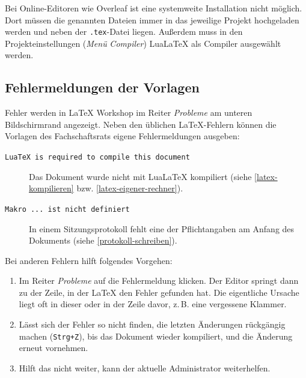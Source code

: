 
Bei Online-Editoren wie Overleaf ist eine systemweite Installation nicht möglich. Dort müssen die genannten Dateien immer in das jeweilige Projekt hochgeladen werden und neben der \texttt{.tex}-Datei liegen. Außerdem muss in den Projekteinstellungen (\textit{Menü} \textrightarrow{} \textit{Compiler}) LuaLaTeX als Compiler ausgewählt werden.

\subsection{Fehlermeldungen der Vorlagen}
\label{latex-fehlermeldungen}
Fehler werden in LaTeX Workshop im Reiter \textit{Probleme} am unteren Bildschirmrand angezeigt. Neben den üblichen \LaTeX{}-Fehlern können die Vorlagen des Fachschaftsrats eigene Fehlermeldungen ausgeben:
\begin{description}
	\item[\texttt{LuaTeX is required to compile this document}] Das Dokument wurde nicht mit LuaLaTeX kompiliert (siehe \autoref{latex-kompilieren} bzw. \autoref{latex-eigener-rechner}).
	\item[\texttt{Makro ... ist nicht definiert}] In einem Sitzungsprotokoll fehlt eine der Pflichtangaben am Anfang des Dokuments (siehe \autoref{protokoll-schreiben}).
\end{description}

Bei anderen Fehlern hilft folgendes Vorgehen:
\begin{enumerate}
	\item Im Reiter \textit{Probleme} auf die Fehlermeldung klicken. Der Editor springt dann zu der Zeile, in der \LaTeX{} den Fehler gefunden hat. Die eigentliche Ursache liegt oft in dieser oder in der Zeile davor, z.\,B. eine vergessene Klammer.
	\item Lässt sich der Fehler so nicht finden, die letzten Änderungen rückgängig machen (\texttt{Strg+Z}), bis das Dokument wieder kompiliert, und die Änderung erneut vornehmen.
	\item Hilft das nicht weiter, kann der aktuelle Administrator weiterhelfen.
\end{enumerate}
